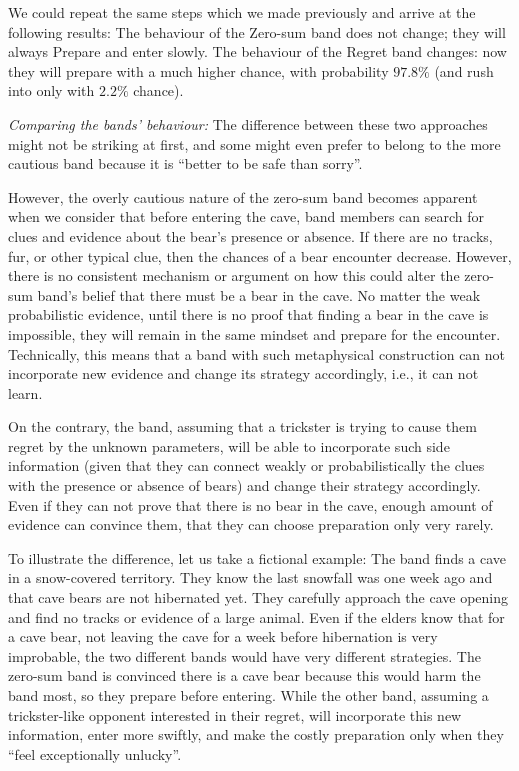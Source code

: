 \documentclass{article}
\begin{document}
We could repeat the same steps which we made previously and arrive at the following results:
The behaviour of the Zero-sum band does not change; they will always Prepare and enter slowly.
The behaviour of the Regret band changes: now they will prepare with a much higher chance, with probability $97.8\%$ (and rush into only with $2.2\%$ chance).

{\it Comparing the bands' behaviour:}
The difference between these two approaches might not be striking at first, and some might even prefer to belong to the more cautious band because it is ``better to be safe than sorry''.

However, the overly cautious nature of the zero-sum band becomes apparent when we consider that before entering the cave, band members can search for clues and evidence about the bear's presence or absence.
If there are no tracks, fur, or other typical clue, then the chances of a bear encounter decrease.
However, there is no consistent mechanism or argument on how this could alter the zero-sum band’s belief that there must be a bear in the cave.
No matter the weak probabilistic evidence, until there is no proof that finding a bear in the cave is impossible, they will remain in the same mindset and prepare for the encounter.
Technically, this means that a band with such metaphysical construction can not incorporate new evidence and change its strategy accordingly, i.e., it can not learn.

On the contrary, the band, assuming that a trickster is trying to cause them regret by the unknown parameters, will be able to incorporate such side information (given that they can connect weakly or probabilistically the clues with the presence or absence of bears) and change their strategy accordingly.
Even if they can not prove that there is no bear in the cave, enough amount of evidence can convince them, that they can choose preparation only very rarely.

To illustrate the difference, let us take a fictional example:
The band finds a cave in a snow-covered territory. They know the last snowfall was one week ago and that cave bears are not hibernated yet. They carefully approach the cave opening and find no tracks or evidence of a large animal.
Even if the elders know that for a cave bear, not leaving the cave for a week before hibernation is very improbable, the two different bands would have very different strategies.
The zero-sum band is convinced there is a cave bear because this would harm the band most, so they prepare before entering.
While the other band, assuming a trickster-like opponent interested in their regret, will incorporate this new information, enter more swiftly, and make the costly preparation only when they ``feel exceptionally unlucky''.
\end{document}
